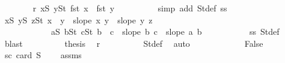 \begin{isabellebody}
\ \ \ \ \ \ \isamarkupfalse%
\ r{}{\isacharcolon}{\kern0pt}\ {\isachardoublequoteopen}{\isacharparenleft}{\kern0pt}{\isasymforall}x{\isasymin}S{}{\isachardot}{\kern0pt}\ {\isasymforall}y{\isasymin}S{}t{\isachardot}{\kern0pt}\ fst\ x\ {\isacharless}{\kern0pt}\ fst\ y{\isacharparenright}{\kern0pt}{\isachardoublequoteclose}\isanewline
\ \ \ \ \ \ \ \ \isamarkupfalse%
\ {\isacharparenleft}{\kern0pt}simp\ add{\isacharcolon}{\kern0pt}\ S{}t{\isacharunderscore}{\kern0pt}def\ s{}s{}{\isacharparenleft}{\kern0pt}{}{\isacharcomma}{\kern0pt}{}{\isacharparenright}{\kern0pt}{\isacharparenright}{\kern0pt}\isanewline
\ \ \ \ \ \ \isamarkupfalse%
\ {\isachardoublequoteopen}{\isacharparenleft}{\kern0pt}{\isasymforall}x{\isasymin}S{}{\isachardot}{\kern0pt}\ {\isasymforall}y{\isasymin}S{}{\isachardot}{\kern0pt}\ {\isasymforall}z{\isasymin}S{}t{\isachardot}{\kern0pt}\ x\ {\isacharless}{\kern0pt}\ y\ {\isasymlongrightarrow}\ slope\ x\ y\ {\isacharless}{\kern0pt}\ slope\ y\ z{\isacharparenright}{\kern0pt}\ {\isasymand}\isanewline
\ \ \ \ \ \ \ \ \ \ \ \ {\isacharparenleft}{\kern0pt}{\isasymforall}a{\isasymin}S{}{\isachardot}{\kern0pt}\ {\isasymforall}b{\isasymin}S{}t{\isachardot}{\kern0pt}\ {\isasymforall}c{\isasymin}S{}t{\isachardot}{\kern0pt}\ b\ {\isacharless}{\kern0pt}\ c\ {\isasymlongrightarrow}\ slope\ b\ c\ {\isacharless}{\kern0pt}\ slope\ a\ b{\isacharparenright}{\kern0pt}{\isachardoublequoteclose}\ \isanewline
\ \ \ \ \ \ \ \ \isamarkupfalse%
\ s{}s{}\ S{}t{\isacharunderscore}{\kern0pt}def\ \isamarkupfalse%
\ blast\isanewline
\ \ \ \ \ \ \isamarkupfalse%
\ \isamarkupfalse%
\ {\isacharquery}{\kern0pt}thesis\ \isamarkupfalse%
\ r{}\isanewline
\ \ \ \ \ \ \ \ \isamarkupfalse%
\ S{}t{\isacharunderscore}{\kern0pt}def\ \isamarkupfalse%
\ auto\isanewline
\ \ \ \ \isamarkupfalse%
\isanewline
\ \ \ \ \ \ \isamarkupfalse%
\ False\isanewline
\ \ \ \ \ \ \isamarkupfalse%
\ s{}{\isacharunderscore}{\kern0pt}c{}{\isacharcolon}{\kern0pt}\ {\isachardoublequoteopen}card\ S{}\ {\isasymge}\ {}{\isachardoublequoteclose}\ \isamarkupfalse%
\ assms{\isacharparenleft}{\kern0pt}{}{\isacharparenright}{\kern0pt}\ \isamarkupfalse%

\end{isabellebody}
